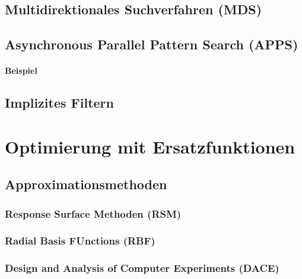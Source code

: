         \subsection{Multidirektionales Suchverfahren (MDS)} %

        \subsection{Asynchronous Parallel Pattern Search (APPS)} %

            \paragraph{Beispiel} %

        \subsection{Implizites Filtern} %

    \section{Optimierung mit Ersatzfunktionen} %

        \subsection{Approximationsmethoden} %

            \subsubsection{Response Surface Methoden (RSM)} %

            \subsubsection{Radial Basis FUnctions (RBF)} %

            \subsubsection{Design and Analysis of Computer Experiments (DACE)} %

